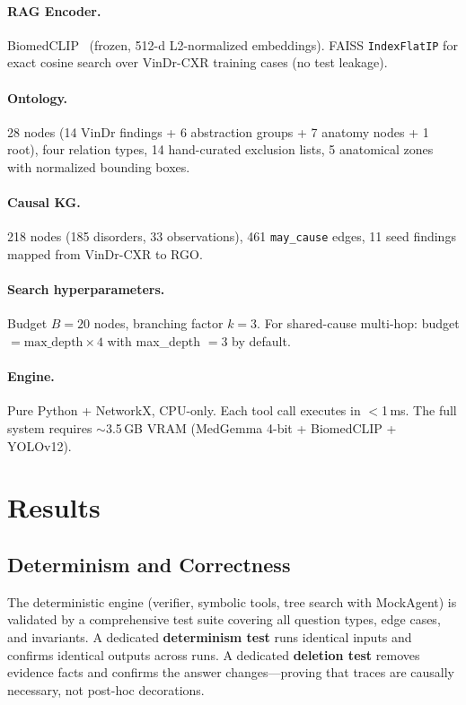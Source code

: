 \documentclass[runningheads]{llncs}
\begin{document}
\paragraph{RAG Encoder.}
BiomedCLIP~\cite{zhang2024biomedclip} (frozen, 512-d L2-normalized
embeddings). FAISS \texttt{IndexFlatIP} for exact cosine search over
VinDr-CXR training cases (no test leakage).

\paragraph{Ontology.}
28 nodes (14 VinDr findings + 6 abstraction groups + 7 anatomy nodes
+ 1 root), four relation types, 14 hand-curated exclusion
lists, 5 anatomical zones with normalized bounding boxes.

\paragraph{Causal KG.}
218 nodes (185 disorders, 33 observations), 461 \texttt{may\_cause} edges,
11 seed findings mapped from VinDr-CXR to RGO.

\paragraph{Search hyperparameters.}
Budget $B = 20$ nodes, branching factor $k = 3$.
For shared-cause multi-hop: budget $= \text{max\_depth} \times 4$ with
max\_depth $= 3$ by default.

\paragraph{Engine.}
Pure Python + NetworkX, CPU-only. Each tool call executes in $<$1\,ms.
The full system requires $\sim$3.5\,GB VRAM (MedGemma 4-bit + BiomedCLIP
+ YOLOv12).

\section{Results}
\label{sec:results}

\subsection{Determinism and Correctness}

The deterministic engine (verifier, symbolic tools, tree search with
MockAgent) is validated by a comprehensive test suite covering all question
types, edge cases, and invariants.
A dedicated \textbf{determinism test} runs identical inputs and confirms
identical outputs across runs.
A dedicated \textbf{deletion test} removes evidence facts and confirms
the answer changes---proving that traces are causally necessary, not
post-hoc decorations.
\end{document}
